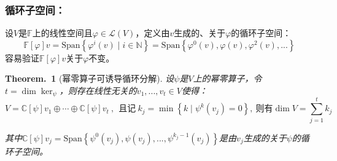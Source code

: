 \documentclass[zihao=-4,UTF8]{report}
\theoremstyle{mystyle} %
\newtheorem{theorem}{Theorem.\,}
\begin{document}
\subsubsection{循环子空间：}
设$V$是$\mathbb{F}$上的线性空间且$\varphi \in \mathscr{L}(V)$，定义由$v$生成的、关于$\varphi$的循环子空间：
\begin{equation*}
    \mathbb{F}[\varphi]v = \text{Span}\left\{\varphi^i(v)\mid i \in \mathbb{N} \right\} = \text{Span}\left\{\varphi^0(v), \varphi(v), \varphi^2(v),... \right\}
\end{equation*}
容易验证$\mathbb{F}[\varphi]v$关于$\varphi$不变。


\begin{theorem}[幂零算子可诱导循环分解]\label{循环分解}
设$\psi$是$V$上的幂零算子，令$t = \dim \ker_{\psi} $，则存在线性无关的$v_1,...,v_t \in V$使得：
\begin{equation*}
    V = \mathbb{C}[\psi]v_1 \oplus \cdots \oplus \mathbb{C}[\psi]v_t\ ,\ \ \text{且记}\ k_j = \min \left\{k\mid \psi^k(v_j)=0 \right\},\ \text{则有}\dim V = \sum_{j=1}^{t} k_j
\end{equation*}\par
{\color{gray}\small 其中$\mathbb{C}[\psi]v_j = \text{Span}\left\{\psi^0(v_j),\psi(v_j),...,\psi^{k_j-1}(v_j) \right\}$是由$v_j$生成的关于$\psi$的循环子空间。}
\end{theorem}
\end{document}
